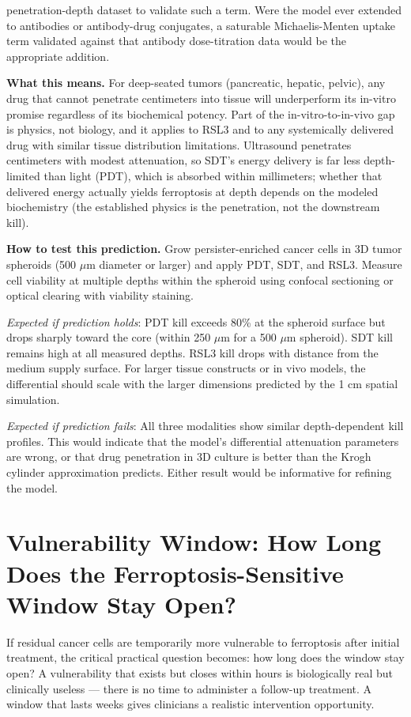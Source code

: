 \documentclass[11pt,twoside,openright]{report}
\begin{document}
penetration-depth dataset to validate such a term. Were the model ever extended to antibodies or antibody-drug conjugates, a saturable Michaelis-Menten uptake term validated against that antibody dose-titration data would be the appropriate addition.

\textbf{What this means.} For deep-seated tumors (pancreatic, hepatic, pelvic), any drug that cannot penetrate centimeters into tissue will underperform its in-vitro promise regardless of its biochemical potency. Part of the in-vitro-to-in-vivo gap is physics, not biology, and it applies to RSL3 and to any systemically delivered drug with similar tissue distribution limitations. Ultrasound penetrates centimeters with modest attenuation, so SDT's energy delivery is far less depth-limited than light (PDT), which is absorbed within millimeters; whether that delivered energy actually yields ferroptosis at depth depends on the modeled biochemistry (the established physics is the penetration, not the downstream kill).

\textbf{How to test this prediction.} Grow persister-enriched cancer cells in 3D tumor spheroids (500 $\mu$m diameter or larger) and apply PDT, SDT, and RSL3. Measure cell viability at multiple depths within the spheroid using confocal sectioning or optical clearing with viability staining.

\textit{Expected if prediction holds}: PDT kill exceeds 80\% at the spheroid surface but drops sharply toward the core (within 250 $\mu$m for a 500 $\mu$m spheroid). SDT kill remains high at all measured depths. RSL3 kill drops with distance from the medium supply surface. For larger tissue constructs or in vivo models, the differential should scale with the larger dimensions predicted by the 1 cm spatial simulation.

\textit{Expected if prediction fails}: All three modalities show similar depth-dependent kill profiles. This would indicate that the model's differential attenuation parameters are wrong, or that drug penetration in 3D culture is better than the Krogh cylinder approximation predicts. Either result would be informative for refining the model.

\section{Vulnerability Window: How Long Does the Ferroptosis-Sensitive Window Stay Open?}

If residual cancer cells are temporarily more vulnerable to ferroptosis after initial treatment, the critical practical question becomes: how long does the window stay open? A vulnerability that exists but closes within hours is biologically real but clinically useless --- there is no time to administer a follow-up treatment. A window that lasts weeks gives clinicians a realistic intervention opportunity.
\end{document}
